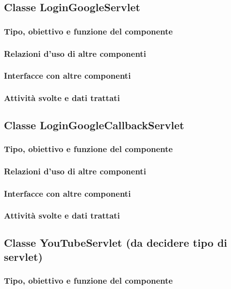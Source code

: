 \subsection{Classe LoginGoogleServlet}
\subsubsection*{Tipo, obiettivo e funzione del componente}
\subsubsection*{Relazioni d'uso di altre componenti}
\subsubsection*{Interfacce con altre componenti}
\subsubsection*{Attivit\`a svolte e dati trattati}

\subsection{Classe LoginGoogleCallbackServlet}
\subsubsection*{Tipo, obiettivo e funzione del componente}
\subsubsection*{Relazioni d'uso di altre componenti}
\subsubsection*{Interfacce con altre componenti}
\subsubsection*{Attivit\`a svolte e dati trattati}

\subsection{Classe YouTubeServlet (da decidere tipo di servlet)}
\subsubsection*{Tipo, obiettivo e funzione del componente}
